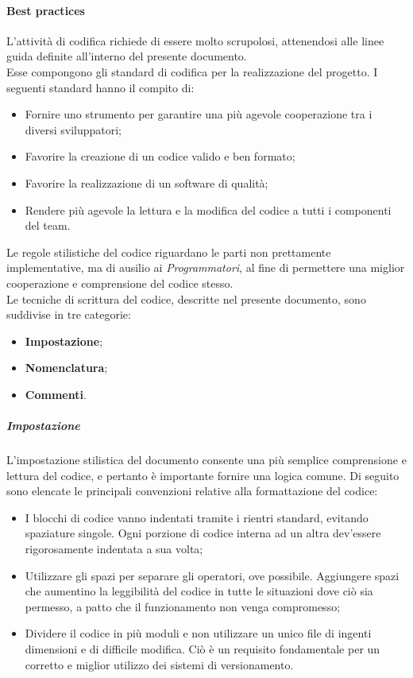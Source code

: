 		\paragraph{Best practices}
		L'attività di codifica richiede di essere molto scrupolosi, attenendosi alle linee guida definite all'interno del presente documento.\\
		Esse compongono gli standard di codifica per la realizzazione del progetto. I seguenti standard hanno il compito di:
		\begin{itemize}
			\item Fornire uno strumento per garantire una più agevole cooperazione tra i diversi sviluppatori;
			\item Favorire la creazione di un codice valido e ben formato;
			\item Favorire la realizzazione di un software di qualità;
			\item Rendere più agevole la lettura e la modifica del codice a tutti i componenti del team.
		\end{itemize}
		Le regole stilistiche del codice riguardano le parti non prettamente implementative, ma di ausilio ai \textit{Programmatori}, al fine di permettere una miglior cooperazione e comprensione del codice stesso.\\
		Le tecniche di scrittura del codice, descritte nel presente documento, sono suddivise in tre categorie:
		\begin{itemize}
			\item \textbf{Impostazione};
			\item \textbf{Nomenclatura};
			\item \textbf{Commenti}.
		\end{itemize}
	
			\subparagraph{Impostazione}
			L'impostazione stilistica del documento consente una più semplice comprensione e lettura del codice, e pertanto è importante fornire una logica comune. Di seguito sono elencate le principali convenzioni relative alla formattazione del codice: 
			\begin{itemize}
				\item I blocchi di codice vanno indentati tramite i rientri standard, evitando spaziature singole. Ogni porzione di codice interna ad un altra dev'essere rigorosamente indentata a sua volta;
				\item Utilizzare gli spazi per separare gli operatori, ove possibile. Aggiungere spazi che aumentino la leggibilità del codice in tutte le situazioni dove ciò sia permesso, a patto che il funzionamento non venga compromesso;
				\item Dividere il codice in più moduli e non utilizzare un unico file di ingenti dimensioni e di difficile modifica. Ciò è un requisito fondamentale per un corretto e miglior utilizzo dei sistemi di versionamento.
			\end{itemize}
	
